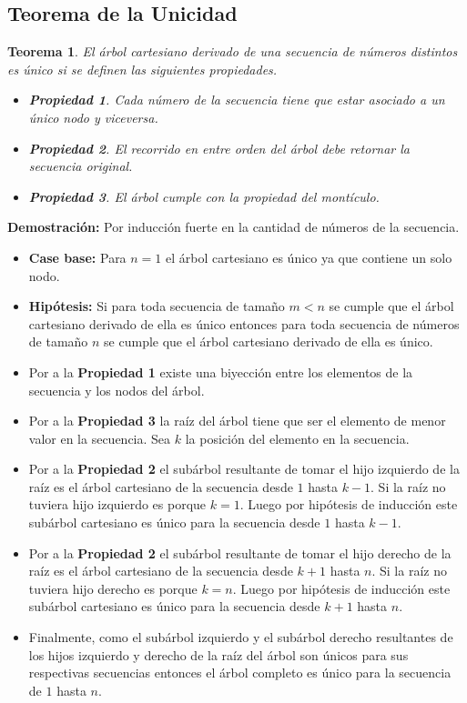 \documentclass[12pt]{article}
\newcommand{\proof}{\textbf{Demostración:} }
\newcommand{\ct}{árbol cartesiano }
\newtheorem{theorem}{Teorema}
\newtheorem{propertie}{Propiedad}
\begin{document}
\subsection{Teorema de la Unicidad}

\begin{theorem}
	El \ct derivado de una secuencia de números distintos es único si se definen las siguientes propiedades.
	\begin{itemize}
		\item \begin{propertie} Cada número de la secuencia tiene que estar asociado a un único nodo y viceversa. \end{propertie}
		\item \begin{propertie} El recorrido en entre orden del árbol debe retornar la secuencia original. \end{propertie}
		\item \begin{propertie} El árbol cumple con la propiedad del montículo. \end{propertie}
	\end{itemize}
\end{theorem}

\proof Por inducción fuerte en la cantidad de números de la secuencia.
\begin{itemize}
	\item \textbf{Case base:} Para $n = 1$ el \ct es único ya que contiene un solo nodo.
	\item \textbf{Hipótesis:} Si para toda secuencia de tamaño $m < n$ se cumple que el \ct derivado de ella es único entonces para toda secuencia de números de tamaño $n$ se cumple que el \ct derivado de ella es único.
	\item Por a la \textbf{Propiedad 1} existe una biyección entre los elementos de la secuencia y los nodos del árbol.
	\item Por a la \textbf{Propiedad 3} la raíz del árbol tiene que ser el elemento de menor valor en la secuencia. Sea $k$ la posición del elemento en la secuencia.
	\item Por a la \textbf{Propiedad 2} el subárbol resultante de tomar el hijo izquierdo de la raíz es el \ct de la secuencia desde $1$ hasta $k - 1$. Si la raíz no tuviera hijo izquierdo es porque $k = 1$. Luego por hipótesis de inducción este subárbol cartesiano es único para la secuencia desde $1$ hasta $k - 1$.
	\item Por a la \textbf{Propiedad 2} el subárbol resultante de tomar el hijo derecho de la raíz es el \ct de la secuencia desde $k + 1$ hasta $n$. Si la raíz no tuviera hijo derecho es porque $k = n$. Luego por hipótesis de inducción este subárbol cartesiano es único para la secuencia desde $k + 1$ hasta $n$.
	\item Finalmente, como el subárbol izquierdo y el subárbol derecho resultantes de los hijos izquierdo y derecho de la raíz del árbol son únicos para sus respectivas secuencias entonces el árbol completo es único para la secuencia de $1$ hasta $n$. 
\end{itemize}
\end{document}
